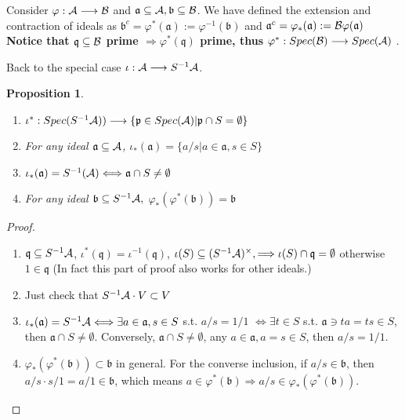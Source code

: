 \documentclass[11pt]{article}
\newtheorem{prop}[thm]{Proposition}
\newcommand{\sca}{{\mathfrak a}}
\newcommand{\scb}{{\mathfrak b}}
\newcommand{\scp}{{\mathfrak p}}
\newcommand{\scq}{\mathfrak q}
\newcommand{\cala}{{\cal A}}
\newcommand{\calb}{{\cal B}}
\newcommand{\Lrta}{\Longrightarrow}
\newcommand{\lrta}{\longrightarrow}
\newcommand{\Llrta}{\Longleftrightarrow}
\begin{document}
Consider $\varphi:\cala\lrta\calb$ and $\sca\subseteq \cala, \scb\subseteq \calb$. We have defined the extension and contraction of ideals as $\scb^{c}=\varphi^{*}(\sca):=\varphi^{-1}(\scb)$ and $\sca^{c}=\varphi_*(\sca):=\calb\varphi(\sca)$ \textbf{Notice that 
$\scq\subseteq \calb$ prime $\Lrta \varphi^{*}(\scq)$ prime,
thus $\varphi^*:Spec(\calb)\lrta Spec(\cala)$
}.

Back to the special case $\iota :\cala\lrta S^{-1}\cala$.
\begin{prop}\ 
\begin{enumerate}[label=(\alph*)]
\item $\iota^*:Spec(S^{-1}\cala))\lrta\{\scp\in Spec(\cala)|\scp\cap S=\emptyset\}$
\item For any ideal $\sca\subseteq \cala$, $\iota_*(\sca)=\{a/s|a\in\sca,s\in S\}$
\item $\iota_*(\sca)=S^{-1}(\cala)\Llrta\sca\cap S\neq \emptyset$
\item For any ideal $\scb\subseteq S^{-1}\cala,$ $\varphi_{*}(\varphi^*(\scb))=\scb$
\end{enumerate}
\end{prop}
\begin{proof}\ 
\begin{enumerate}[label=(\alph*)]
    \item $\scq\subseteq S^{-1}\cala$, $\iota^*(\scq)=\iota^{-1}(\scq)$, $\iota(S)\subseteq (S^{-1}\cala)^\times,\Lrta \iota(S)\cap\scq=\emptyset$ otherwise $1\in \scq$ (In fact this part of proof also works for other ideals.)
\item 
Just check that $S^{-1}\cala \cdot V\subset V$
\item
 $\iota_*(\sca)=S^{-1}\cala\Llrta \exists a\in \sca, s\in S$ s.t. $a/s=1/1$
$\Llrta\exists t\in S$ s.t. $\sca\ni ta=ts\in S$, then $\sca\cap S\neq\emptyset$. Conversely, $\sca\cap S\neq \emptyset$, any $a\in \sca, a=s\in S$, then $a/s=1/1$.
\item 
 $\varphi_*(\varphi^*(\scb))\subset \scb$ in general. For the converse inclusion, if $a/s\in \scb$, then $a/s\cdot s/1=a/1\in\scb$, which means $a\in \varphi^{*}(\scb)\Lrta a/s\in \varphi_{*}(\varphi^*(\scb))$. 
\end{enumerate} 
\end{proof}
\end{document}
